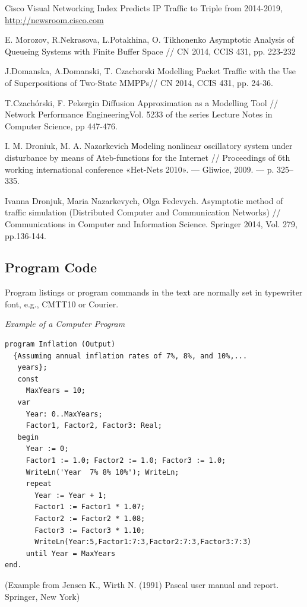 \documentclass[runningheads,a4paper]{llncs}
\begin{document}
\begin{thebibliography}{6}

 Cisco Visual Networking Index Predicts IP Traffic to Triple from 2014-2019, \url{http://newsroom.cisco.com}

 E. Morozov, R.Nekrasova, L.Potakhina, O. Tikhonenko Asymptotic Analysis of Queueing Systems with Finite Buffer Space // CN 2014, CCIS 431, pp. 223-232

 J.Domanska, A.Domanski, T. Czachorski Modelling Packet Traffic with the Use of Superpositions of Two-State MMPPs// CN 2014, CCIS 431, pp. 24-36.

 T.Czachórski, F. Pekergin Diffusion Approximation as a Modelling Tool // Network Performance EngineeringVol. 5233 of the series Lecture Notes in Computer Science, pp 447-476.

 I. M. Droniuk, M. A. Nazarkevich Мodeling nonlinear oscillatory system under disturbance by means of Ateb-functions for the Internet  // Proceedings of 6th working international conference «Het-Nets 2010». — Gliwice, 2009. — p. 325–335.

 Ivanna Dronjuk, Maria Nazarkevych, Olga Fedevych. Asymptotic method of traffic simulation (Distributed Computer and Communication Networks) // Communications in Computer and Information Science. Springer 2014, Vol. 279, pp.136-144.

\end{thebibliography}



\subsection{Program Code}

Program listings or program commands in the text are normally set in
typewriter font, e.g., CMTT10 or Courier.

\medskip

\noindent
{\it Example of a Computer Program}
\begin{verbatim}
program Inflation (Output)
  {Assuming annual inflation rates of 7%, 8%, and 10%,...
   years};
   const
     MaxYears = 10;
   var
     Year: 0..MaxYears;
     Factor1, Factor2, Factor3: Real;
   begin
     Year := 0;
     Factor1 := 1.0; Factor2 := 1.0; Factor3 := 1.0;
     WriteLn('Year  7% 8% 10%'); WriteLn;
     repeat
       Year := Year + 1;
       Factor1 := Factor1 * 1.07;
       Factor2 := Factor2 * 1.08;
       Factor3 := Factor3 * 1.10;
       WriteLn(Year:5,Factor1:7:3,Factor2:7:3,Factor3:7:3)
     until Year = MaxYears
end.
\end{verbatim}
%
\noindent
{\small (Example from Jensen K., Wirth N. (1991) Pascal user manual and
report. Springer, New York)}
\end{document}
